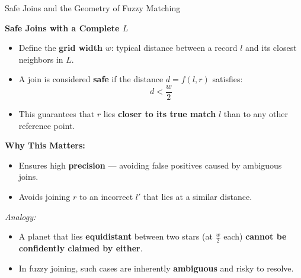 \documentclass[8pt]{beamer} %
\begin{document}
\begin{frame}{Safe Joins and the Geometry of Fuzzy Matching}
	
	\textbf{Safe Joins with a Complete $L$}
	\begin{itemize}
		\item Define the \textbf{grid width} $w$: typical distance between a record $l$ and its closest neighbors in $L$.
		\item A join is considered \textbf{safe} if the distance $d = f(l, r)$ satisfies:
		\[
		d < \frac{w}{2}
		\]
		\item This guarantees that $r$ lies \textbf{closer to its true match} $l$ than to any other reference point.
	\end{itemize}
	
	\vspace{0.5em}
	\textbf{Why This Matters:}
	\begin{itemize}
		\item Ensures high \textbf{precision} — avoiding false positives caused by ambiguous joins.
		\item Avoids joining $r$ to an incorrect $l'$ that lies at a similar distance.
	\end{itemize}
	
	\vspace{0.5em}
	\textit{Analogy:}
	\begin{itemize}
		\item A planet that lies \textbf{equidistant} between two stars (at $\frac{w}{2}$ each) \textbf{cannot be confidently claimed by either}.
		\item In fuzzy joining, such cases are inherently \textbf{ambiguous} and risky to resolve.
	\end{itemize}
	
\end{frame}
\end{document}
